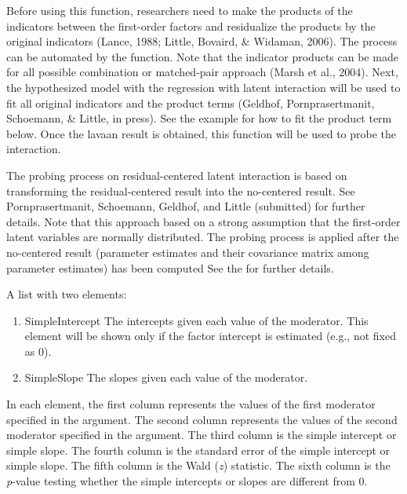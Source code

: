 \documentclass[a4paper]{book}
\begin{document}
\begin{Details}\relax
Before using this function, researchers need to make the products of the indicators between the first-order factors and residualize the products by the original indicators (Lance, 1988; Little, Bovaird, \& Widaman, 2006). The process can be automated by the  function. Note that the indicator products can be made for all possible combination or matched-pair approach (Marsh et al., 2004). Next, the hypothesized model with the regression with latent interaction will be used to fit all original indicators and the product terms (Geldhof, Pornprasertmanit,  Schoemann, \& Little, in press). See the example for how to fit the product term below. Once the lavaan result is obtained, this function will be used to probe the interaction.

The probing process on residual-centered latent interaction is based on transforming the residual-centered result into the no-centered result. See Pornprasertmanit, Schoemann, Geldhof, and Little (submitted) for further details. Note that this approach based on a strong assumption that the first-order latent variables are normally distributed. The probing process is applied after the no-centered result (parameter estimates and their covariance matrix among parameter estimates) has been computed See the  for further details.
\end{Details}
%
\begin{Value}
A list with two elements:
\begin{enumerate}

\item SimpleIntercept The intercepts given each value of the moderator. This element will be shown only if the factor intercept is estimated (e.g., not fixed as 0).
\item SimpleSlope The slopes given each value of the moderator. 

\end{enumerate}

In each element, the first column represents the values of the first moderator specified in the  argument. The second column represents the values of the second moderator specified in the  argument. The third column is the simple intercept or simple slope. The fourth column is the standard error of the simple intercept or simple slope. The fifth column is the Wald (\emph{z}) statistic. The sixth column is the \emph{p}-value testing whether the simple intercepts or slopes are different from 0.
\end{Value}
\end{document}
